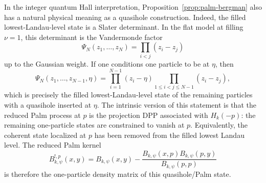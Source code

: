 \documentclass[12pt,a4paper,reqno]{article}
\theoremstyle{thmstyleone}
\theoremstyle{thmstylethree}
\theoremstyle{thmstyletwo}
\newtheorem{remark}[theorem]{Remark}
\numberwithin{equation}{subsection}
\begin{document}
In the integer quantum Hall interpretation, Proposition~\ref{prop:palm-bergman} also has a natural physical meaning as a quasihole construction. Indeed, the filled lowest-Landau-level state is a Slater determinant. In the flat model at filling $\nu=1$, this determinant is the Vandermonde factor
\[
    \Psi_N(z_1,\ldots,z_N)
    =
    \prod_{i<j}(z_i-z_j)
\]
up to the Gaussian weight. If one conditions one particle to be at $\eta$, then
\[
    \Psi_N(z_1,\ldots,z_{N-1},\eta)
    =
    \prod_{i=1}^{N-1}(z_i-\eta)
    \prod_{1\le i<j\le N-1}(z_i-z_j),
\]
which is precisely the filled lowest-Landau-level state of the remaining particles with a quasihole inserted at $\eta$. The intrinsic version of this statement is that the reduced Palm process at $p$ is the projection DPP associated with $H_k(-p)$: the remaining one-particle states are constrained to vanish at $p$. Equivalently, the coherent state localized at $p$ has been removed from the filled lowest Landau level. The reduced Palm kernel
\[
    B_{k,\psi}^{!,p}(x,y)
    =
    B_{k,\psi}(x,y)
    -
    \frac{B_{k,\psi}(x,p)B_{k,\psi}(p,y)}{B_{k,\psi}(p,p)}
\]
is therefore the one-particle density matrix of this quasihole/Palm state.



\end{document}
